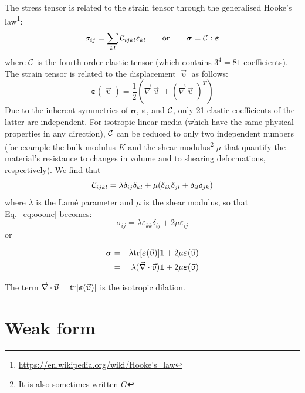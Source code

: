 The stress tensor is related to the strain tensor through the generalised 
Hooke's law\footnote{\url{https://en.wikipedia.org/wiki/Hooke's_law}}:
\begin{equation}
\sigma_{ij}=\sum_{kl}{\cal C}_{ijkl}\varepsilon_{kl} 
\qquad
\text{or}
\qquad
{\bm \sigma} = {\cal C} : {\bm \varepsilon}
\label{eq:ooone}
\end{equation}
where ${\cal C}$ is the fourth-order elastic tensor (which contains $3^4=81$ coefficients).
The strain tensor is related to the displacement $\vec{\upupsilon}$ as follows: 
\begin{equation}
{\bm \varepsilon}(\vec{\upupsilon}) 
= \frac{1}{2}\left(\vec{\nabla}\vec{\upupsilon} + (\vec{\nabla}\vec{\upupsilon})^T\right)
\end{equation}
Due to the inherent symmetries of ${\bm \sigma}$, ${\bm \varepsilon}$, and ${\cal C}$, 
only 21 elastic coefficients of the latter are independent. For isotropic linear media (which have the same physical 
properties in any direction), ${\cal C}$ can be reduced to only two independent numbers 
(for example the bulk modulus $K$ and the shear modulus\footnote{It is also sometimes written $G$} 
$\mu$ that quantify the material's resistance to changes in volume and to shearing deformations, respectively).
We find that
\[
{\cal C}_{ijkl} = \lambda \delta_{ij}\delta_{kl} + \mu (\delta_{ik}\delta_{jl}+\delta_{il}\delta_{jk})
\]
where $\lambda$ is the Lam\'e parameter and $\mu$ is the shear modulus, 
so that Eq.~\eqref{eq:ooone} becomes:
\[
\sigma_{ij}=\lambda \varepsilon_{kk} \delta_{ij} + 2\mu \varepsilon_{ij}
\]
or
\begin{mdframed}[backgroundcolor=blue!5]
\begin{eqnarray}
{\bm \sigma}
&=&\lambda {\rm tr}[{\bm \varepsilon}(\vec{\upupsilon})] {\bm 1} 
+2\mu {\bm \varepsilon}(\vec{\upupsilon})
\nonumber\\
&=&\lambda (\vec{\nabla}\cdot\vec{\upupsilon}) {\bm 1} +2\mu {\bm \varepsilon}(\vec{\upupsilon}) 
\label{eq:twooELAST}
\end{eqnarray}
\end{mdframed}
The term $\vec{\nabla}\cdot\vec{\upupsilon}={\rm tr}[{\bm \varepsilon}(\vec{\upupsilon})]$ is the isotropic dilation.


\section{Weak form}

